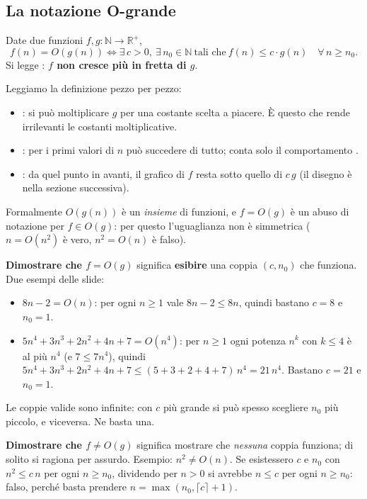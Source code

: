 \subsection*{La notazione O-grande}

\begin{definizione}[: O-grande]
Date due funzioni $f, g : \mathbb{N} \to \mathbb{R}^{+}$,
\[
f(n) = O(g(n)) \iff \exists\, c > 0,\ \exists\, n_0 \in \mathbb{N} \ \text{tali che}\
f(n) \le c \cdot g(n) \quad \forall\, n \ge n_0 .
\]
Si legge : \textbf{$f$ non cresce più in fretta di $g$}.
\end{definizione}

Leggiamo la definizione pezzo per pezzo:
\begin{itemize}
  \item {}: si può moltiplicare $g$ per una costante scelta a piacere.
        È questo che rende irrilevanti le costanti moltiplicative.
  \item \q{esiste $n_0$}: per i primi valori di $n$ può succedere di tutto; conta solo
        il comportamento \q{da $n_0$ in poi}.
  \item {}: da quel punto in avanti, il grafico di $f$ resta sotto
        quello di $c\,g$ (il disegno è nella sezione successiva).
\end{itemize}
Formalmente $O(g(n))$ è un \emph{insieme} di funzioni, e $f = O(g)$ è un abuso di
notazione per $f \in O(g)$: per questo l'uguaglianza non è simmetrica
($n = O(n^2)$ è vero, $n^2 = O(n)$ è falso).

\textbf{Dimostrare che $f = O(g)$} significa \textbf{esibire} una coppia $(c, n_0)$
che funziona. Due esempi delle slide:
\begin{itemize}
  \item $8n - 2 = O(n)$: per ogni $n \ge 1$ vale $8n - 2 \le 8n$, quindi bastano
        $c = 8$ e $n_0 = 1$.
  \item $5n^4 + 3n^3 + 2n^2 + 4n + 7 = O(n^4)$: per $n \ge 1$ ogni potenza $n^k$ con
        $k \le 4$ è al più $n^4$ (e $7 \le 7n^4$), quindi
        $5n^4 + 3n^3 + 2n^2 + 4n + 7 \le (5+3+2+4+7)\, n^4 = 21\, n^4$.
        Bastano $c = 21$ e $n_0 = 1$.
\end{itemize}
Le coppie valide sono infinite: con $c$ più grande si può spesso scegliere $n_0$ più
piccolo, e viceversa. Ne basta una.

\textbf{Dimostrare che $f \neq O(g)$} significa mostrare che \emph{nessuna} coppia
funziona; di solito si ragiona per assurdo. Esempio: $n^2 \neq O(n)$. Se esistessero
$c$ e $n_0$ con $n^2 \le c\,n$ per ogni $n \ge n_0$, dividendo per $n > 0$ si
avrebbe $n \le c$ per ogni $n \ge n_0$: falso, perché basta prendere
$n = \max(n_0, \lceil c \rceil + 1)$.

